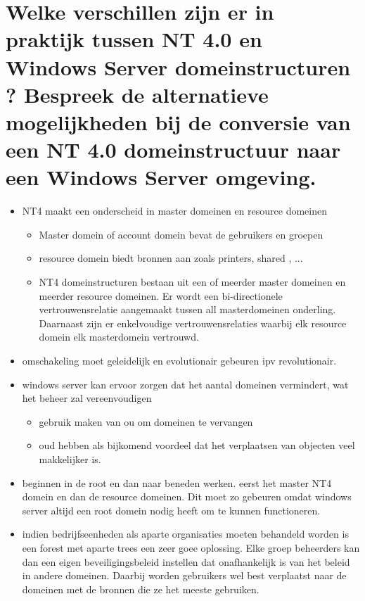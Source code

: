 \section{Welke verschillen zijn er in praktijk tussen NT 4.0 en Windows Server domeinstructuren ? Bespreek de alternatieve mogelijkheden bij de conversie van een NT 4.0 domeinstructuur naar een Windows Server omgeving.}
\begin{itemize}
\item NT4 maakt een onderscheid in master domeinen en resource domeinen
\begin{itemize}
\item Master domein of account domein bevat de gebruikers en groepen 
\item resource domein biedt bronnen aan zoals printers, shared , ...
\item NT4 domeinstructuren bestaan uit een of meerder master domeinen en meerder resource domeinen. Er wordt een bi-directionele vertrouwensrelatie aangemaakt tussen all masterdomeinen onderling. Daarnaast zijn er enkelvoudige vertrouwensrelaties waarbij elk resource domein elk masterdomein vertrouwd.
\end{itemize}
\item omschakeling moet geleidelijk en evolutionair gebeuren ipv revolutionair.

\item windows server kan ervoor zorgen dat het aantal domeinen vermindert, wat het beheer zal vereenvoudigen
\begin{itemize}
\item gebruik maken van ou om domeinen te vervangen
\item oud hebben als bijkomend voordeel dat het verplaatsen van objecten veel makkelijker is.
\end{itemize}

\item beginnen in de root en dan naar beneden werken. eerst het master NT4 domein en dan de resource domeinen. Dit moet zo gebeuren omdat windows server altijd een root domein nodig heeft om te kunnen functioneren.

\item indien bedrijfseenheden als aparte organisaties moeten behandeld worden is een forest met aparte trees een zeer goee oplossing. Elke groep beheerders kan dan een eigen beveiligingsbeleid instellen dat onafhankelijk is van het beleid in andere domeinen. Daarbij worden gebruikers wel best verplaatst naar de domeinen met de bronnen die ze het meeste gebruiken.


\end{itemize}
